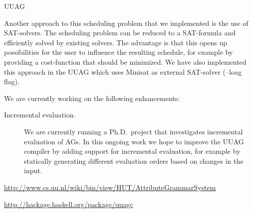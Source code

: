 \begin{hcarentry}{UUAG}
\begin{description}
Another approach to this scheduling problem that we implemented is the use of SAT-solvers. The scheduling problem can be reduced to a SAT-formula and efficiently solved by existing solvers. The advantage is that this opens up possibilities for the user to influence the resulting schedule, for example by providing a cost-function that should be minimized. We have also implemented this approach in the UUAG which uses Minisat as external SAT-solver (--loag flag).
\end{description}

We are currently working on the following enhancements:
\begin{description}
\item[Incremental evaluation.]
  We are currently running a Ph.D.\ project that investigates incremental evaluation of
  AGs. In this ongoing work we hope to improve the UUAG compiler by adding support for
  incremental evaluation, for example by statically generating different evaluation orders
  based on changes in the input.
\end{description}

\FurtherReading
\begin{compactitem}
\item
  \url{http://www.cs.uu.nl/wiki/bin/view/HUT/AttributeGrammarSystem}
\item
  \url{http://hackage.haskell.org/package/uuagc}
\end{compactitem}
\end{hcarentry}

